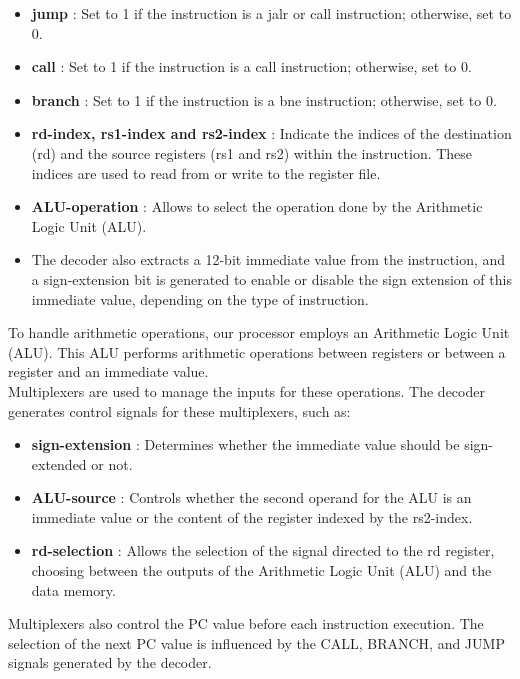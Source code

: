 \documentclass[a4paper,12pt]{article}
\begin{document}
\begin{itemize}
    \item \textbf{jump} : Set to 1 if the instruction is a jalr or call instruction; otherwise, set to 0.
    \item \textbf{call} : Set to 1 if the instruction is a call instruction; otherwise, set to 0.
    \item \textbf{branch} : Set to 1 if the instruction is a bne instruction; otherwise, set to 0.
    \item \textbf{rd-index, rs1-index and rs2-index} : Indicate the indices of the destination (rd) and the source registers (rs1 and rs2) within the instruction. These indices are used to read from or write to the register file.
    \item \textbf{ALU-operation} : Allows to select the operation done by the Arithmetic Logic Unit (ALU).
    \item The decoder also extracts a 12-bit immediate value from the instruction, and a sign-extension bit is generated to enable or disable the sign extension of this immediate value, depending on the type of instruction.
\end{itemize}

To handle arithmetic operations, our processor employs an Arithmetic Logic Unit (ALU). This ALU performs arithmetic operations between registers or between a register and an immediate value.\\

Multiplexers are used to manage the inputs for these operations. The decoder generates control signals for these multiplexers, such as:

\begin{itemize}
    \item \textbf{sign-extension} : Determines whether the immediate value should be sign-extended or not.
    \item \textbf{ALU-source} : Controls whether the second operand for the ALU is an immediate value or the content of the register indexed by the rs2-index.
    \item \textbf{rd-selection} : Allows the selection of the signal directed to the rd register, choosing between the outputs of the Arithmetic Logic Unit (ALU) and the data memory.
\end{itemize}

Multiplexers also control the PC value before each instruction execution. The selection of the next PC value is influenced by the CALL, BRANCH, and JUMP signals generated by the decoder.\\
\end{document}
